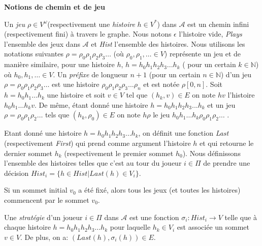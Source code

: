 \noindent\textbf{Notions de chemin et de jeu}


Un \textit{jeu} $\rho \in V^{\omega}$(respectivement une \textit{histoire} $h \in V^{*}$) dans $\mathcal{A}$ est un chemin infini (respectivement fini) à travers le graphe. Nous notons $\epsilon$ l'histoire vide, \textit{Plays} l'ensemble des jeux dans $\mathcal{A}$ et \textit{Hist} l'ensemble des histoires. Nous utilisons les notations suivantes $\rho = \rho _{0}  \rho _{1} \rho _{2}\rho _{3} \ldots$ (où $\rho _{0},  \rho _{1},\ldots \in V$)  représente un jeu et de manière similaire, pour une histoire $h$, $ h = h_{0} h_{1} h_{2} h_{3} ... h_{k}$ ( pour un certain $k \in \mathbb{N}$) où  $h_{0}, h_{1}, \ldots \in V$.
Un \textit{préfixe} de longueur $n+1$ (pour un certain $n\in \mathbb{N}$) d'un jeu $\rho = \rho _{0}  \rho _{1} \rho _{2}\rho _{3} \ldots$ est une histoire $\rho _{0}  \rho _{1} \rho _{2}\rho _{3} \ldots \rho _{n}$ et est notée $\rho[0,n]$. Soit $ h = h_{0} h_{1} \ldots h_{k}$ une histoire et soit $v \in V$ tel que $(h_{k},v)\in E$ on note $hv$ l'histoire $h_{0} h_{1} \ldots h_{k}v$. De même, étant donné une histoire $ h = h_{0} h_{1} h_{2} h_{3} ... h_{k}$ et un jeu $\rho = \rho _{0}  \rho _{1} \rho _{2} \ldots$ tels que $(h_{k},\rho_{0})\in E$ on note $h\rho$ le jeu $ h_{0} h_{1} \ldots h_{k}\rho _{0}  \rho _{1} \rho _{2} \ldots$ .

Etant donné une histoire $ h = h_{0} h_{1} h_{2} h_{3} ... h_{k}$,  on définit une fonction \textit{Last} (respectivement \textit{First}) qui prend comme argument l'histoire $h$ et qui retourne le dernier sommet $h_{k}$ (respectivement le premier sommet $h_{0}$). Nous définissons l'ensemble des histoires telles que c'est au tour du joueur $i \in \Pi$ de prendre une décision $Hist_{i} = \{ h \in Hist | Last(h) \in V_{i} \}$.

\begin{rem}
	Si un sommet initial $v_{0}$ a été fixé, alors tous les jeux (et toutes les histoires) commencent par le sommet $v_{0}.$\\
\end{rem}


\begin{defi}[Stratégie]
	Une \textit{stratégie} d'un joueur $i \in \Pi$ dans $\mathcal{A}$ est une fonction \mbox{$\sigma _{i}: Hist_{i} \rightarrow V$} telle que à chaque histoire $ h = h_{0} h_{1} h_{2} h_{3} ... h_{k}$ pour laquelle $h_{k} \in V_{i}$ est associée un sommet $v \in V$. De plus, on a: $(Last(h),\sigma _{i}(h))\in E$.
\end{defi}

